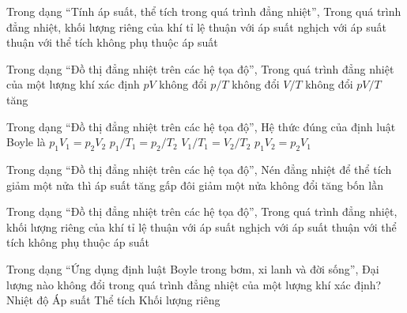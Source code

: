 \begin{ex}
Trong dạng “Tính áp suất, thể tích trong quá trình đẳng nhiệt”, Trong quá trình đẳng nhiệt, khối lượng riêng của khí tỉ lệ
\choice
{\True thuận với áp suất}
{nghịch với áp suất}
{thuận với thể tích}
{không phụ thuộc áp suất}
\end{ex}

\begin{ex}
Trong dạng “Đồ thị đẳng nhiệt trên các hệ tọa độ”, Trong quá trình đẳng nhiệt của một lượng khí xác định
\choice
{\True $pV$ không đổi}
{$p/T$ không đổi}
{$V/T$ không đổi}
{$pV/T$ tăng}
\end{ex}

\begin{ex}
Trong dạng “Đồ thị đẳng nhiệt trên các hệ tọa độ”, Hệ thức đúng của định luật Boyle là
\choice
{\True $p_1V_1=p_2V_2$}
{$p_1/T_1=p_2/T_2$}
{$V_1/T_1=V_2/T_2$}
{$p_1V_2=p_2V_1$}
\end{ex}

\begin{ex}
Trong dạng “Đồ thị đẳng nhiệt trên các hệ tọa độ”, Nén đẳng nhiệt để thể tích giảm một nửa thì áp suất
\choice
{\True tăng gấp đôi}
{giảm một nửa}
{không đổi}
{tăng bốn lần}
\end{ex}

\begin{ex}
Trong dạng “Đồ thị đẳng nhiệt trên các hệ tọa độ”, Trong quá trình đẳng nhiệt, khối lượng riêng của khí tỉ lệ
\choice
{\True thuận với áp suất}
{nghịch với áp suất}
{thuận với thể tích}
{không phụ thuộc áp suất}
\end{ex}

\begin{ex}
Trong dạng “Ứng dụng định luật Boyle trong bơm, xi lanh và đời sống”, Đại lượng nào không đổi trong quá trình đẳng nhiệt của một lượng khí xác định?
\choice
{\True Nhiệt độ}
{Áp suất}
{Thể tích}
{Khối lượng riêng}
\end{ex}

